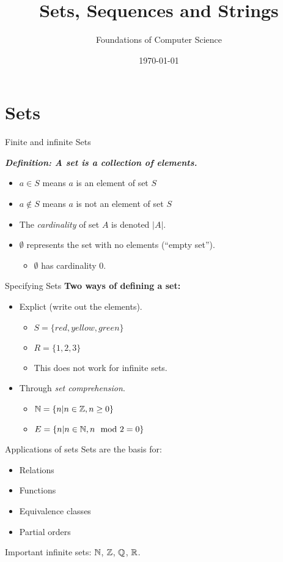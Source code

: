 \documentclass[style=sailor,size=12pt]{powerdot}
\title{Sets, Sequences and Strings}
\author{Foundations of Computer Science}
\date{\today}
\begin{document}
\maketitle
\section[slide=false]{Sets}

\begin{slide}[bm=,toc=]{Finite and infinite Sets}

\emph{\textbf{Definition: A set is a collection of elements.}}
\begin{itemize}
   \item $a \in S$ means $a$ is an element of set $S$ 
   \item $a \notin S$ means $a$ is not an element of set $S$
   \item The \emph{cardinality} of set $A$ is denoted $|A|$. 
   \item $\emptyset$ represents the set with no elements (``empty set'').
   \begin{itemize}
       \item $\emptyset$ has cardinality 0. 
   \end{itemize}
\end{itemize} 
\end{slide}

\begin{slide}[bm=,toc=]{Specifying Sets}
\textbf{Two ways of defining a set:}
\begin{itemize}
   \item Explict (write out the elements).
   \begin{itemize}
      \item $S = \{red, yellow, green\}$ 
      \item $R = \{1,2,3\}$
      \item This does not work for infinite sets.
   \end{itemize} 
   \item Through \emph{set comprehension}. 
   \begin{itemize}
      \item $\mathbb{N} = \{n| n \in \mathbb{Z}, n \geq 0\}$ 
      \item $E = \{n| n \in \mathbb{N}, n \mod{2} = 0 \}$
   \end{itemize}
\end{itemize} 

\end{slide}


\begin{slide}[bm=,toc=]{Applications of sets}
Sets are the basis for:
\begin{itemize}
   \item Relations
   \item Functions
   \item Equivalence classes
   \item Partial orders
\end{itemize}
Important infinite sets: $\mathbb{N}$, $\mathbb{Z}$, $\mathbb{Q}$, $\mathbb{R}$.
\end{slide}
\end{document}
